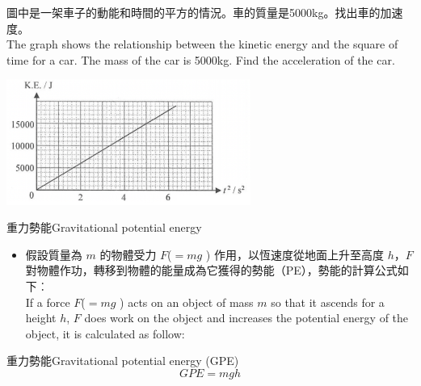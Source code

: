 \documentclass[beamer=true]{standalone}
\begin{document}
\begin{eg}
    圖中是一架車子的動能和時間的平方的情況。車的質量是5000kg。找出車的加速度。\\The graph shows the relationship between the kinetic energy and the square of time for a car. The mass of the car is 5000kg. Find the acceleration of the car.
        {\par\raggedleft
            \includegraphics[width=0.6\textwidth]{assets/3643740d.png}
            \par}
\end{eg}





\begin{frame}{重力勢能Gravitational potential energy}
    \begin{itemize}
        \item 假設質量為 $m$ 的物體受力 $F$($=mg$ ) 作用，以恆速度從地面上升至高度 $h$，$F$ 對物體作功，轉移到物體的能量成為它獲得的勢能（PE），勢能的計算公式如下︰\\If a force $F$($=mg$ ) acts on an object of mass $m$ so that it ascends for a height $h$, $F$ does work on the object and increases the potential energy of the object, it is calculated as follow:
    \end{itemize}
    \bigskip
    \begin{alertblock}
        {重力勢能Gravitational potential energy (GPE)}
        \begin{equation}
            GPE=mgh
        \end{equation}
    \end{alertblock}
\end{frame}
\end{document}
